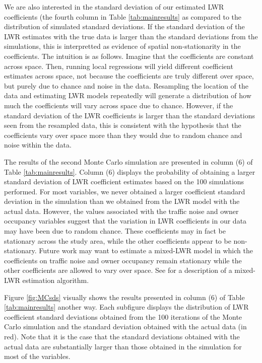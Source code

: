 \documentclass{article}\usepackage{graphicx, color}
\begin{document}
We are also interested in the standard deviation of our estimated LWR coefficients (the fourth column in Table \ref{tab:mainresults} as compared to the distribution of simulated standard deviations. If the standard deviation of the LWR estimates with the true data is larger than the standard deviations from the simulations, this is interpretted as evidence of spatial non-stationarity in the coefficients. The intuition is as follows. Imagine that the coefficients are constant across space. Then, running local regressions will yield different coefficient estimates across space, not because the coefficients are truly different over space, but purely due to chance and noise in the data. Resampling the location of the data and estimating LWR models repeatedly will generate a distribution of how much the coefficients will vary across space due to chance. However, if the standard deviation of the LWR coefficients is larger than the standard deviations seen from the resampled data, this is consistent with the hypothesis that the coefficients vary over space more than they would due to random chance and noise within the data. 

The results of the second Monte Carlo simulation are presented in column (6) of Table \ref{tab:mainresults}. Column (6) displays the probability of obtaining a larger standard deviation of LWR coefficient estimates based on the 100 simulations performed. For most variables, we never obtained a larger coefficient standard deviation in the simulation than we obtained from the LWR model with the actual data. However, the values associated with the traffic noise and owner occupancy variables suggest that the variation in LWR coefficients in our data may have been due to random chance. These coefficients may in fact be stationary across the study area, while the other coefficients appear to be non-stationary. Future work may want to estimate a mixed-LWR model in which the coefficients on traffic noise and owner occupancy remain stationary while the other coefficients are allowed to vary over space. See \citet{Fotheringham2002} for a description of a mixed-LWR estimation algorithm. 

Figure \ref{fig:MCsds} visually shows the results presented in column (6) of Table \ref{tab:mainresults} another way. Each subfigure displays the distribution of LWR coefficient standard deviations obtained from the 100 iterations of the Monte Carlo simulation and the standard deviation obtained with the actual data (in red). Note that it is the case that the standard deviations obtained with the actual data are substantially larger than those obtained in the simulation for most of the variables.
\end{document}
